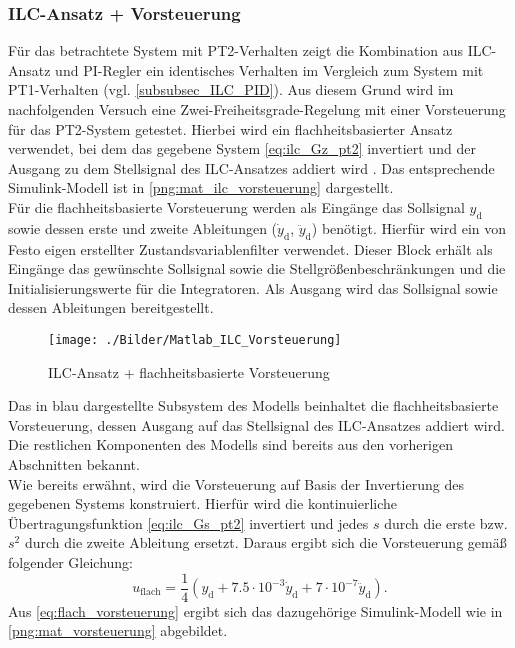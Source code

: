 \subsubsection{ILC-Ansatz + Vorsteuerung}
Für das betrachtete System mit PT2-Verhalten zeigt die Kombination aus ILC-Ansatz und PI-Regler ein identisches Verhalten im Vergleich zum System mit PT1-Verhalten (vgl. \autoref{subsubsec_ILC_PID}). Aus diesem Grund wird im nachfolgenden Versuch eine Zwei-Freiheitsgrade-Regelung mit einer Vorsteuerung für das PT2-System getestet. Hierbei wird ein flachheitsbasierter Ansatz verwendet, bei dem das gegebene System \autoref{eq:ilc_Gz_pt2} invertiert und der Ausgang zu dem Stellsignal des ILC-Ansatzes addiert wird \cite{Zeitz+2010+5+13}. Das entsprechende Simulink-Modell ist in \autoref{png:mat_ilc_vorsteuerung} dargestellt. \\
Für die flachheitsbasierte Vorsteuerung werden als Eingänge das Sollsignal $y_\mathrm{d}$ sowie dessen erste und zweite Ableitungen ($\dot{y}_\mathrm{d}$, $\ddot{y}_\mathrm{d}$) benötigt. Hierfür wird ein von Festo eigen erstellter Zustandsvariablenfilter verwendet. Dieser Block erhält als Eingänge das gewünschte Sollsignal sowie die Stellgrößenbeschränkungen und die Initialisierungswerte für die Integratoren. Als Ausgang wird das Sollsignal sowie dessen Ableitungen bereitgestellt. 
\begin{figure}[H]
	\centering
	\texttt{[image: ./Bilder/Matlab\_ILC\_Vorsteuerung]}
	\caption{ILC-Ansatz + flachheitsbasierte Vorsteuerung}
	\label{png:mat_ilc_vorsteuerung}
\end{figure}
Das in blau dargestellte Subsystem des Modells beinhaltet die flachheitsbasierte Vorsteuerung, dessen Ausgang auf das Stellsignal des ILC-Ansatzes addiert wird. Die restlichen Komponenten des Modells sind bereits aus den vorherigen Abschnitten bekannt.\\
Wie bereits erwähnt, wird die Vorsteuerung auf Basis der Invertierung des gegebenen Systems konstruiert. Hierfür wird die kontinuierliche Übertragungsfunktion \autoref{eq:ilc_Gs_pt2} invertiert und jedes $s$ durch die erste bzw. $s^2$ durch die zweite Ableitung ersetzt. Daraus ergibt sich die Vorsteuerung gemäß folgender Gleichung:
\begin{equation}
	\label{eq:flach_vorsteuerung}
	u_\mathrm{flach} = \frac{1}{4} \left( y_\mathrm{d} + 7.5 \cdot 10^{-3} \dot{y}_\mathrm{d} + 7 \cdot 10^{-7} \ddot{y}_\mathrm{d} \right).
\end{equation}
Aus \autoref{eq:flach_vorsteuerung} ergibt sich das dazugehörige Simulink-Modell wie in \autoref{png:mat_vorsteuerung} abgebildet.\\
